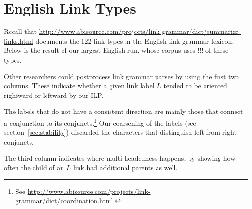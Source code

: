 \documentclass[11pt]{article}
\begin{document}
% 
% 

\section{English Link Types}\label{app:linktypes}

Recall that \url{http://www.abisource.com/projects/link-grammar/dict/summarize-links.html} documents the 122 link types in the English link grammar lexicon.  Below is the result of our largest English run, whose corpus uses !!! of these types.  

Other researchers could postprocess link grammar parses by using the first two columns.  These indicate whether a given link label $L$ tended to be oriented rightward or leftward by our ILP.  

The labels that do not have a consistent direction are mainly those that connect a conjunction to its conjuncts.\footnote{See \url{http://www.abisource.com/projects/link-grammar/dict/coordination.html}.}  
Our coarsening of the labels (see section~\ref{sec:stability}) discarded the characters that distinguish left from right conjuncts.

The third column indicates where multi-headedness happens, by showing how often the child of an $L$ link had additional parents as well.
\end{document}

